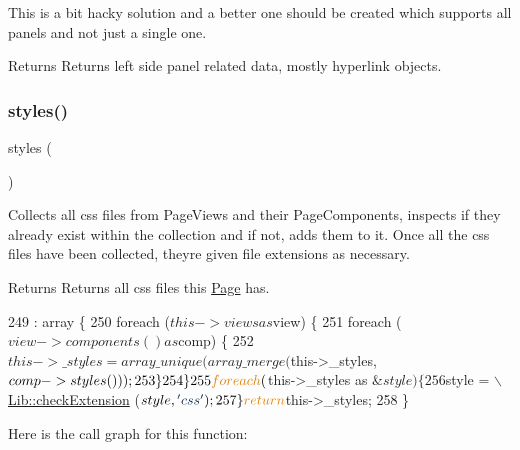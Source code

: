 This is a bit hacky solution and a better one should be created which supports all panels and not just a single one. \begin{DoxyReturn}{Returns}
Returns left side panel related data, mostly hyperlink objects. 
\end{DoxyReturn}

\mbox{\label{class_lora_1_1_page_a53d31780f290c90071a213e9f786abb3}} 
\subsubsection{\texorpdfstring{styles()}{styles()}}
{\footnotesize\ttfamily styles (\begin{DoxyParamCaption}{ }\end{DoxyParamCaption})}

Collects all css files from Page\+Views and their Page\+Components, inspects if they already exist within the collection and if not, adds them to it. Once all the css files have been collected, they\textquotesingle{}re given file extensions as necessary. \begin{DoxyReturn}{Returns}
Returns all css files this \hyperlink{class_lora_1_1_page}{Page} has. 
\end{DoxyReturn}

\begin{DoxyCode}
249                               : array \{
250         \textcolor{keywordflow}{foreach} ($this->views as $view) \{
251             \textcolor{keywordflow}{foreach} ($view->components () as $comp) \{
252                 $this->\_styles = array\_unique (array\_merge ($this->\_styles, $comp->styles ()));
253             \}
254         \}
255         \textcolor{keywordflow}{foreach} ($this->\_styles as &$style) \{
256             $style = \hyperlink{class_lib_ab5fbdf394f09fcef4dcea271c344cb65}{\(\backslash\)Lib::checkExtension} ($style, \textcolor{stringliteral}{'css'});
257         \} \textcolor{keywordflow}{return} $this->\_styles;
258     \}
\end{DoxyCode}
Here is the call graph for this function\+:
\mbox{\label{class_lora_1_1_page_a420c4b91157962374150f731a2ac57dc}} 
